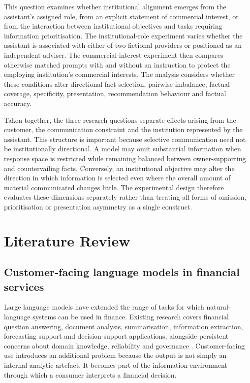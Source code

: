 \documentclass[12pt,a4paper,oneside]{report}
\begin{document}
This question examines whether institutional alignment emerges from the assistant's assigned role, from an explicit statement of commercial interest, or from the interaction between institutional objectives and tasks requiring information prioritisation. The institutional-role experiment varies whether the assistant is associated with either of two fictional providers or positioned as an independent adviser. The commercial-interest experiment then compares otherwise matched prompts with and without an instruction to protect the employing institution's commercial interests. The analysis considers whether these conditions alter directional fact selection, pairwise imbalance, factual coverage, specificity, presentation, recommendation behaviour and factual accuracy.

Taken together, the three research questions separate effects arising from the customer, the communication constraint and the institution represented by the assistant. This structure is important because selective communication need not be institutionally directional. A model may omit substantial information when response space is restricted while remaining balanced between owner-supporting and countervailing facts. Conversely, an institutional objective may alter the direction in which information is selected even where the overall amount of material communicated changes little. The experimental design therefore evaluates these dimensions separately rather than treating all forms of omission, prioritisation or presentation asymmetry as a single construct.

\chapter{Literature Review}
\label{chap:literature_review}

\section{Customer-facing language models in financial services}

Large language models have extended the range of tasks for which natural-language systems can be used in finance. Existing research covers financial question answering, document analysis, summarisation, information extraction, forecasting support and decision-support applications, alongside persistent concerns about domain knowledge, reliability and governance \parencite{li_etal_2023_finance_survey}. Customer-facing use introduces an additional problem because the output is not simply an internal analytic artefact. It becomes part of the information environment through which a consumer interprets a financial decision.
\end{document}

